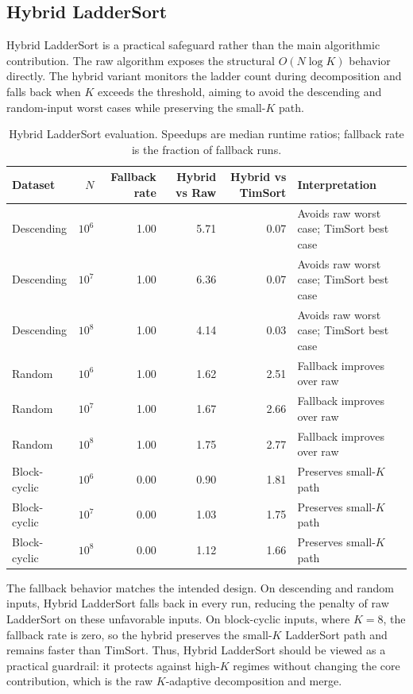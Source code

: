 \documentclass[10pt]{article}
\begin{document}
\subsection{Hybrid LadderSort}
\label{hybrid-laddersort}

Hybrid LadderSort is a practical safeguard rather than the main algorithmic
contribution. The raw algorithm exposes the structural \(O(N\log K)\) behavior
directly. The hybrid variant monitors the ladder count during decomposition and
falls back when \(K\) exceeds the threshold, aiming to avoid the descending and
random-input worst cases while preserving the small-\(K\) path.

\begin{table}[H]
\centering
\scriptsize
\caption{Hybrid LadderSort evaluation. Speedups are median runtime ratios; fallback rate is the fraction of fallback runs.}
\label{tab:phase4-hybrid}
\begin{tabularx}{\linewidth}{@{}l r r r r X@{}}
\toprule
Dataset & \(N\) & Fallback rate & Hybrid vs Raw & Hybrid vs TimSort & Interpretation \\
\midrule
Descending & \(10^6\) & 1.00 & 5.71 & 0.07 & Avoids raw worst case; TimSort best case \\
Descending & \(10^7\) & 1.00 & 6.36 & 0.07 & Avoids raw worst case; TimSort best case \\
Descending & \(10^8\) & 1.00 & 4.14 & 0.03 & Avoids raw worst case; TimSort best case \\
Random & \(10^6\) & 1.00 & 1.62 & 2.51 & Fallback improves over raw \\
Random & \(10^7\) & 1.00 & 1.67 & 2.66 & Fallback improves over raw \\
Random & \(10^8\) & 1.00 & 1.75 & 2.77 & Fallback improves over raw \\
Block-cyclic & \(10^6\) & 0.00 & 0.90 & 1.81 & Preserves small-\(K\) path \\
Block-cyclic & \(10^7\) & 0.00 & 1.03 & 1.75 & Preserves small-\(K\) path \\
Block-cyclic & \(10^8\) & 0.00 & 1.12 & 1.66 & Preserves small-\(K\) path \\
\bottomrule
\end{tabularx}
\end{table}

The fallback behavior matches the intended design. On descending and random
inputs, Hybrid LadderSort falls back in every run, reducing the penalty of raw
LadderSort on these unfavorable inputs. On block-cyclic inputs, where \(K=8\),
the fallback rate is zero, so the hybrid preserves the small-\(K\) LadderSort
path and remains faster than TimSort. Thus, Hybrid LadderSort should be viewed
as a practical guardrail: it protects against high-\(K\) regimes without
changing the core contribution, which is the raw \(K\)-adaptive decomposition
and merge.
\end{document}
